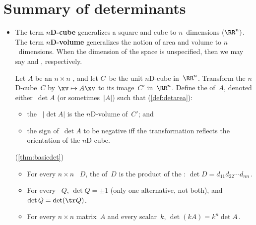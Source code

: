 
\section{Summary of determinants}
\label{sec:sumd}


\begin{itemize}
\def\index#1{}%

\itemhi The `graphical formulas'~\eqref{eq:dets23b} for \(2\times2\) and \(3\times3\) determinants are useful for both theory and many practical small problems.


\subsubsection*{Geometry underlies determinants}

\item The term \index{nD-cube@$n$D-cube|textbf}\textbf{$n$D-cube}  generalizes a square and cube to \(n\)~dimensions (\(\RR^n)\).
The term  \index{nD-volume@$n$D-volume|textbf}\textbf{$n$D-volume} generalizes the notion of area and volume to \(n\)~dimensions.
When the dimension of the space is unspecified, then we may say  and , respectively.

\itemhi Let \(A\) be an \(n\times n\) , and let \(C\)~be the unit \index{nD-cube@$n$D-cube}$n$D-cube in~\(\RR^n\).
Transform the \(n\)D-cube~\(C\) by \(\xv\mapsto A\xv\) to its image~\(C'\) in~\(\RR^n\). 
Define the  of~\(A\), denoted either~\(\det A\) (or sometimes~\(|A|\)) such that (\cref{def:detarea}):  \begin{itemize}
\item the ~\(|\det A|\) is the \index{nD-volume@$n$D-volume}$n$D-volume of~\(C'\); and 
\item the sign of~\(\det A\) to be negative iff the transformation reflects the orientation of the $n$D-cube.
\end{itemize}

\itemhi (\cref{thm:basicdet})
\begin{itemize}
\item   For every \(n\times n\) ~\(D\),
the  of~\(D\) is the product of the : \(\det D=d_{11}d_{22}\cdots d_{nn}\)\,.
\item  For every ~\(Q\),  \(\det Q=\pm1\) (only one alternative, not both), and \(\det Q=\det(\tr Q)\).
\item   For every \(n\times n\) matrix~\(A\) and every scalar~\(k\), \(\det(kA)=k^n\det A\)\,.
\end{itemize}


\end{itemize}
